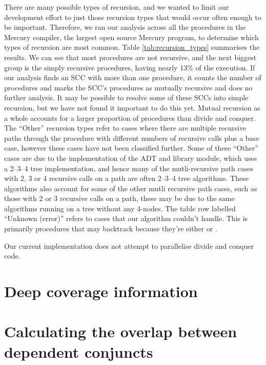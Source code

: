 There are many possible types of recursion,
and we wanted to limit our development effort to just those recursion types
that would occur often enough to be important.
Therefore,
we ran our analysis across all the procedures in the Mercury compiler,
the largest open source Mercury program,
to determine which types of recursion are most common.
Table \ref{tab:recursion_types} summarises the results.
We can see that most procedures are not recursive,
and the next biggest group is the simply recursive procedures,
having nearly 13\% of the execution.
If our analysis finds an SCC with more than one procedure,
it counts the number of procedures and marks the SCC's procedures as
mutually recursive and does no further analysis.
It may be possible to resolve some of these SCCs into simple recursion,
but we have not found it important to do this yet.
Mutual recursion as a whole accounts for a larger proportion of procedures
than divide and conquer.
The ``Other'' recursion types refer to cases where there are multiple
recursive paths through the procedure with different numbers of recursive
calls plus a base case,
however these cases have not been classified further.
Some of these ``Other'' cases are due to the implementation of the
 ADT and library module,
which uses a 2--3--4 tree implementation, and hence many of the
mutli-recursive path cases with 2, 3 or 4 recursive calls on a path
are often 2--3--4 tree algorithms.
These algorithms also account for some of the other mutli recursive path
cases,
such as those with 2 or 3 recursive calls on a path,
these may be due to the same algorithms running on a tree without any
4-nodes.
The table row labelled ``Unknown (error)'' refers to cases that our algorithm
couldn't handle.
This is primarily procedures that may backtrack because they're either
\dnondet or \dmulti.


Our current implementation does not attempt to parallelise divide and conquer
code.

\section{Deep coverage information}


\section{Calculating the overlap between dependent conjuncts}
\label{sec:overlap_overlap_alg}

